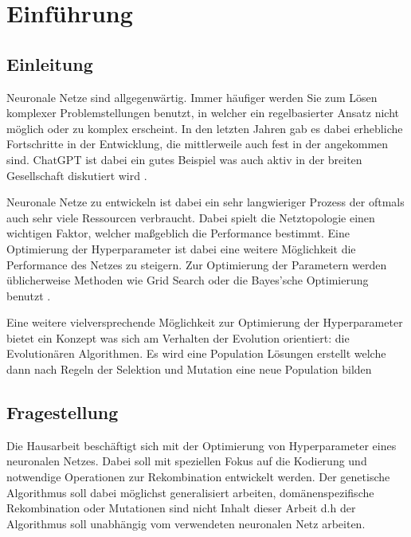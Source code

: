 \chapter{Einführung}
\section{Einleitung}\label{sec:einleitung}
Neuronale Netze sind allgegenwärtig. Immer häufiger werden Sie zum Lösen komplexer Problemstellungen benutzt, in welcher ein regelbasierter Ansatz nicht möglich oder zu komplex erscheint. In den letzten Jahren gab es dabei erhebliche Fortschritte in der Entwicklung, die mittlerweile auch fest in der angekommen sind. ChatGPT ist dabei ein gutes Beispiel was auch aktiv in der breiten Gesellschaft diskutiert wird \parencite{wolfangel_chatgpt_2023}. 

Neuronale Netze zu entwickeln ist dabei ein sehr langwieriger Prozess der oftmals auch sehr viele Ressourcen verbraucht. Dabei spielt die Netztopologie einen wichtigen Faktor, welcher maßgeblich die Performance bestimmt. Eine Optimierung der Hyperparameter ist dabei eine weitere Möglichkeit die Performance des Netzes zu steigern. Zur Optimierung der Parametern werden üblicherweise Methoden wie Grid Search oder die Bayes’sche Optimierung benutzt  \parencite{hutter_hyperparameter_2019}. 

Eine weitere vielversprechende Möglichkeit zur Optimierung der Hyperparameter bietet ein Konzept was sich am Verhalten der Evolution orientiert: die Evolutionären Algorithmen. Es wird eine Population Lösungen erstellt welche dann nach Regeln der Selektion und Mutation eine neue Population bilden \parencite{stelldinger_naturanaloge_2024}

\section{Fragestellung}
Die Hausarbeit beschäftigt sich mit der Optimierung von Hyperparameter eines neuronalen Netzes. Dabei soll mit speziellen Fokus auf die Kodierung und notwendige Operationen zur Rekombination entwickelt werden. Der genetische Algorithmus soll dabei möglichst generalisiert arbeiten, domänenspezifische Rekombination oder Mutationen sind nicht Inhalt dieser Arbeit d.h der Algorithmus soll unabhängig vom verwendeten neuronalen Netz arbeiten. 

